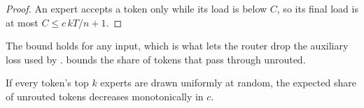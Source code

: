 \begin{proof}
An expert accepts a token only while its load is below $C$, so its final load is at most $C \le c\,kT/n + 1$.
\end{proof}

The bound holds for any input, which is what lets the router drop the auxiliary loss used by \citet{fedus2022switch}.
 bounds the share of tokens that pass through unrouted.

\begin{lemma}
\label{lem:dropped}
If every token's top $k$ experts are drawn uniformly at random, the expected share of unrouted tokens decreases monotonically in $c$.
\end{lemma}
